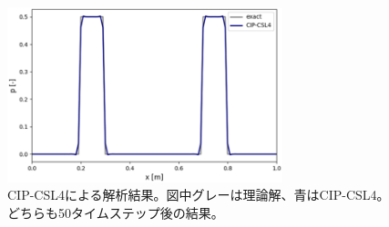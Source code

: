 \documentclass[dvipdfmx, 9pt, a4paper]{jsarticle}
\begin{document}
\begin{figure}[b]
\begin{center}
\includegraphics[width=8cm]{"fig9.png"}
\caption{CIP-CSL4による解析結果。図中グレーは理論解、青はCIP-CSL4。どちらも50タイムステップ後の結果。}
\end{center}
\end{figure}
\end{document}

